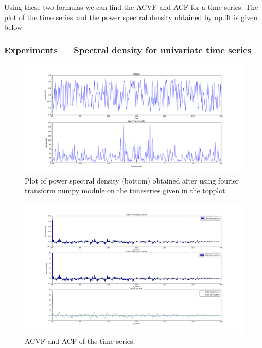 \documentclass{article}
\begin{document}
Using these two formulas we can find the ACVF and ACF for a time series.  The plot of the time series and the power spectral density obtained by np.fft is given below

\subsubsection{Experiments --- Spectral density for univariate time series}

\begin{figure}[ht!]
  \centering
  \includegraphics[width=1\textwidth]{images/spectral_density/psd}
  \caption{Plot of power spectral density (bottom) obtained after using fourier transform numpy module on the timeseries given in the topplot.\label{fig:sd_psd}}
\end{figure}

\begin{figure}[ht!]
  \centering
  \includegraphics[width=1\textwidth]{images/spectral_density/acf_acvf}
  \caption{ACVF and ACF of the time series.\label{fig:sd_acf_acvf}}
\end{figure}
\end{document}
